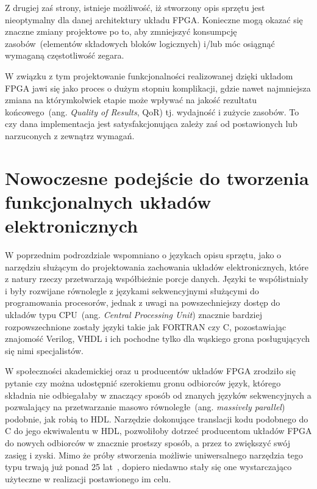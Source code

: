 Z drugiej zaś strony, istnieje możliwość, iż stworzony opis sprzętu jest nieoptymalny dla danej architektury układu FPGA. Konieczne mogą okazać się znaczne zmiany projektowe po to, aby zmniejszyć konsumpcję zasobów~(elementów składowych bloków logicznych) i/lub móc osiągnąć wymaganą częstotliwość zegara. 

W związku z tym projektowanie funkcjonalności realizowanej dzięki układom FPGA jawi się jako proces o dużym stopniu komplikacji, gdzie nawet najmniejsza zmiana na którymkolwiek etapie może wpływać na jakość rezultatu końcowego~(ang. \textit{Quality of Results}, QoR) tj. wydajność i zużycie zasobów. To czy dana implementacja jest satysfakcjonująca zależy zaś od postawionych lub narzuconych z zewnątrz wymagań. 

\section{Nowoczesne podejście do tworzenia funkcjonalnych układów elektronicznych}
W poprzednim podrozdziale wspomniano o językach opisu sprzętu, jako o narzędziu służącym do projektowania zachowania układów elektronicznych, które z natury rzeczy przetwarzają współbieżnie porcje danych. Języki te współistniały i były rozwijane równolegle z językami sekwencyjnymi służącymi do programowania procesorów, jednak z uwagi na powszechniejszy dostęp do układów typu CPU~(ang. \textit{Central Processing Unit}) znacznie bardziej rozpowszechnione zostały języki takie jak FORTRAN czy C, pozostawiając znajomość Verilog, VHDL i ich pochodne tylko dla wąskiego grona posługujących się nimi specjalistów.

W społeczności akademickiej oraz u producentów układów FPGA zrodziło się pytanie czy można udostępnić szerokiemu gronu odbiorców język, którego składnia nie odbiegałaby w znaczący sposób od znanych języków sekwencyjnych a pozwalający na przetwarzanie masowo równoległe~(ang. \textit{massively parallel}) podobnie, jak robią to HDL. Narzędzie dokonujące translacji kodu podobnego do C do jego ekwiwalentu w HDL, pozwoliłoby dotrzeć producentom układów FPGA do nowych odbiorców w znacznie prostszy sposób, a przez to zwiększyć swój zasięg i zyski. Mimo że próby stworzenia możliwie uniwersalnego narzędzia tego typu trwają już ponad 25 lat~\cite{C_VHDL}, dopiero niedawno stały się one wystarczająco użyteczne w realizacji postawionego im celu. 

